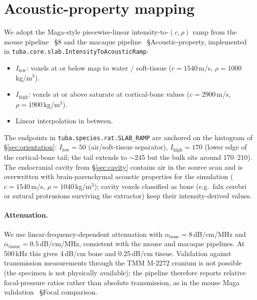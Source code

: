 \documentclass{compactarticle}
\begin{document}
\section{Acoustic-property mapping}
\label{sec:acoustic-mapping}

We adopt the Maga-style piecewise-linear intensity-to-$(c, \rho)$
ramp from the mouse pipeline~\cite{tuba-mouse} \S8 and the macaque
pipeline~\cite{tuba-macaque} \S Acoustic-property, implemented in
\texttt{tuba.core.slab.\allowbreak IntensityToAcousticRamp}:
\begin{itemize}[leftmargin=*]
\setlength\itemsep{0pt}
  \item $I_{\mathrm{low}}$: voxels at or below map to water /
        soft-tissue ($c = 1540$\,m/s, $\rho = 1000$\,kg/m$^3$).
  \item $I_{\mathrm{high}}$: voxels at or above saturate at
        cortical-bone values ($c = 2900$\,m/s,
        $\rho = 1900$\,kg/m$^3$).
  \item Linear interpolation in between.
\end{itemize}
The endpoints in \texttt{tuba.species.rat.SLAB\_RAMP} are anchored
on the histogram of \S\ref{sec:orientation}: $I_{\mathrm{low}}=50$
(air/soft-tissue separator), $I_{\mathrm{high}}=170$ (lower edge of
the cortical-bone tail; the tail extends to $\sim$245 but the bulk
sits around 170--210). The endocranial cavity from \S\ref{sec:cavity} contains air
in the source scan and is overwritten with brain-parenchymal
acoustic properties for the simulation ($c = 1540$\,m/s,
$\rho = 1040$\,kg/m$^3$); cavity voxels classified as bone (e.g.\
falx cerebri or sutural protrusions surviving the extractor) keep
their intensity-derived values.

\paragraph{Attenuation.}
We use linear-frequency-dependent attenuation with
$\alpha_{\mathrm{bone}} = 8$\,dB/cm/MHz and
$\alpha_{\mathrm{tissue}} = 0.5$\,dB/cm/MHz, consistent with the
mouse and macaque pipelines. At 500\,kHz this gives 4\,dB/cm bone
and 0.25\,dB/cm tissue. Validation against transmission measurements
through the TMM M-2272 cranium is not possible (the specimen is not
physically available); the pipeline therefore reports relative
focal-pressure ratios rather than absolute transmission, as in the
mouse Maga validation~\cite{tuba-mouse} \S Focal comparison.
\end{document}
